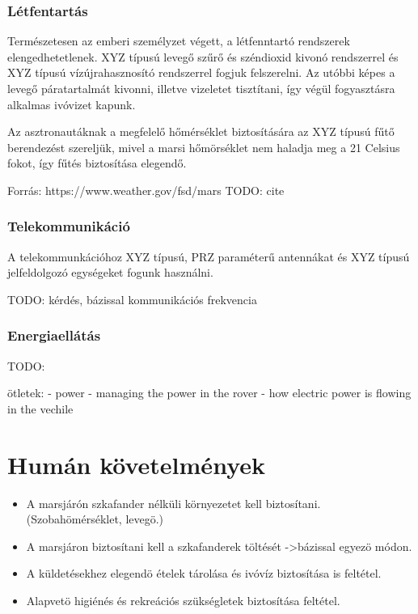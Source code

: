 \documentclass[12pt]{report}
\begin{document}
\subsubsection{Létfentartás}

Természetesen az emberi személyzet végett, a létfenntartó rendszerek elengedhetetlenek. XYZ típusú levegő szűrő és széndioxid kivonó rendszerrel és XYZ típusú vízújrahasznosító rendszerrel fogjuk felszerelni. Az utóbbi képes a levegő páratartalmát kivonni, illetve vizeletet tisztítani, így végül fogyasztásra alkalmas ivóvizet kapunk.

Az asztronautáknak a megfelelő hőmérséklet biztosítására az XYZ típusú fűtő berendezést szereljük, mivel a marsi hőmörséklet nem haladja meg a 21 Celsius fokot, így fűtés biztosítása elegendő.

Forrás: https://www.weather.gov/fsd/mars
TODO: cite

\subsubsection{Telekommunikáció}

A telekommunkációhoz XYZ típusú, PRZ paraméterű antennákat és XYZ típusú jelfeldolgozó egységeket fogunk használni.

TODO: kérdés, bázissal kommunikációs frekvencia



\subsubsection{Energiaellátás}

TODO:

ötletek:
- power
  - managing the power in the rover
  - how electric power is flowing in the vechile

\section{Humán követelmények}
\begin{itemize}
  \item A marsjárón szkafander nélküli környezetet kell biztosítani. (Szobahömérséklet, levegö.)
  \item A marsjáron biztosítani kell a szkafanderek töltését ->bázissal egyezö módon.
  \item A küldetésekhez elegendö ételek tárolása és ivóvíz biztosítása is feltétel.
  \item Alapvetö higiénés és rekreációs szükségletek biztosítása feltétel.
\end{itemize}
\end{document}
